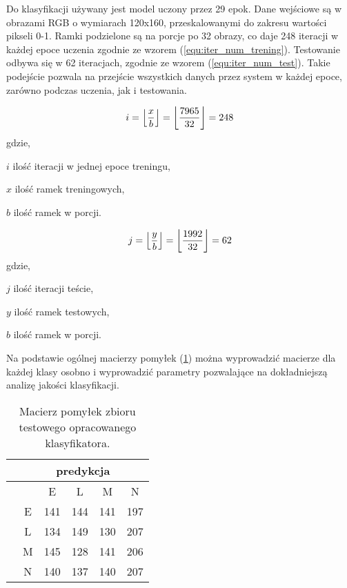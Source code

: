{\parindent0pt
Do klasyfikacji używany jest model uczony przez 29 epok. Dane wejściowe są w obrazami RGB o wymiarach 120x160, przeskalowanymi do zakresu wartości pikseli 0-1. Ramki podzielone są na porcje po 32 obrazy, co daje 248 iteracji w każdej epoce uczenia zgodnie ze wzorem (\ref{equ:iter_num_trening}). Testowanie odbywa się w 62 iteracjach, zgodnie ze wzorem (\ref{equ:iter_num_test}). Takie podejście pozwala na przejście wszystkich danych przez system w każdej epoce, zarówno podczas uczenia, jak i testowania.

\begin{equation}
i = \floor*{\frac{x}{b}} = \floor*{\frac{7965}{32}} = 248
\label{equ:iter_num_trening}
\end{equation}
gdzie,
\begin{eqwhere}[2cm]
	\item[$i$] ilość iteracji w jednej epoce treningu,
	\item[$x$] ilość ramek treningowych,
	\item[$b$] ilość ramek w porcji.
\end{eqwhere}

\begin{equation}
j = \floor*{\frac{y}{b}} = \floor*{\frac{1992}{32}} = 62
\label{equ:iter_num_test}
\end{equation}
gdzie,
\begin{eqwhere}[2cm]
	\item[$j$] ilość iteracji teście,
	\item[$y$] ilość ramek testowych,
	\item[$b$] ilość ramek w porcji.
\end{eqwhere}

Na podstawie ogólnej macierzy pomyłek (\ref{tab:general_conf_matrix}) można wyprowadzić macierze dla każdej klasy osobno i wyprowadzić parametry pozwalające na dokładniejszą analizę jakości klasyfikacji.

\begin{table}[h!]
\centering
\caption[Short Heading]{Macierz pomyłek zbioru testowego opracowanego klasyfikatora.}
\label{tab:general_conf_matrix}
\begin{tabular}{|c|c|c|c|c|c|}
\hline
\textbf{}                           & \multicolumn{5}{c|}{\textbf{predykcja}} \\ \hline
{\multirow{5}{*}{\rotatebox[origin=c]{90}{\textbf{klasa}}}} &         & E       & L        & M      & N       \\ \cline{2-6} 
                                    & E       & 141       & 144      & 141     & 197      \\ \cline{2-6} 
                                    & L       & 134       & 149      & 130      & 207      \\ \cline{2-6} 
                                    & M       & 145       & 128      & 141      & 206      \\ \cline{2-6} 
                                    & N       & 140       & 137      & 140      & 207       \\ \hline
\end{tabular}
\end{table}

}
